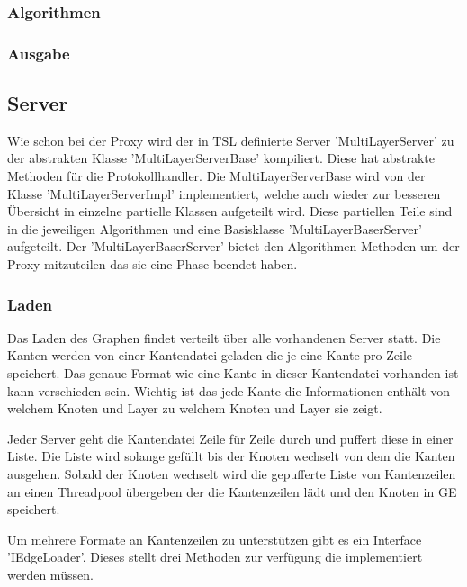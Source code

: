 \subsubsection{Algorithmen}


\subsubsection{Ausgabe}


\subsection{Server}

Wie schon bei der Proxy wird der in TSL definierte Server 'MultiLayerServer' zu der abstrakten Klasse 'MultiLayerServerBase' kompiliert. Diese hat abstrakte Methoden für die Protokollhandler.
Die MultiLayerServerBase wird von der Klasse 'MultiLayerServerImpl' implementiert, welche auch wieder zur besseren Übersicht in einzelne partielle Klassen aufgeteilt wird. Diese partiellen Teile sind in die jeweiligen Algorithmen und eine Basisklasse 'MultiLayerBaserServer' aufgeteilt.
Der 'MultiLayerBaserServer' bietet den Algorithmen Methoden um der Proxy mitzuteilen das sie eine Phase beendet haben.


\subsubsection{Laden}

Das Laden des Graphen findet verteilt über alle vorhandenen Server statt. Die Kanten werden von einer Kantendatei geladen die je eine Kante pro Zeile speichert. Das genaue Format wie eine Kante in dieser Kantendatei vorhanden ist kann verschieden sein. Wichtig ist das jede Kante die Informationen enthält von welchem Knoten und Layer zu welchem Knoten und Layer sie zeigt.

Jeder Server geht die Kantendatei Zeile für Zeile durch und puffert diese in einer Liste. Die Liste wird solange gefüllt bis der Knoten wechselt von dem die Kanten ausgehen. Sobald der Knoten wechselt wird die gepufferte Liste von Kantenzeilen an einen Threadpool übergeben der die Kantenzeilen lädt und den Knoten in GE speichert.

Um mehrere Formate an Kantenzeilen zu unterstützen gibt es ein Interface 'IEdgeLoader'. Dieses stellt drei Methoden zur verfügung die implementiert werden müssen.

